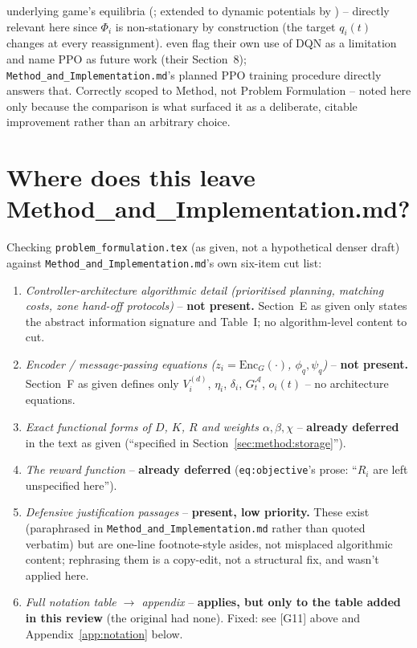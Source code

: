 \documentclass[11pt]{article}
\begin{document}
\begin{itemize}
    underlying game's equilibria (\citealp{ng1999policy}; extended to
    dynamic potentials by \citealp{devlin2012dynamic}) -- directly relevant
    here since $\Phi_i$ is non-stationary by construction (the target $q_i(t)$
    changes at every reassignment). \citeauthor{knippenberg2021} even flag
    their own use of DQN as a limitation and name PPO as future work (their
    Section~8); \texttt{Method\_and\_Implementation.md}'s planned PPO
    training procedure directly answers that. Correctly scoped to Method, not
    Problem Formulation -- noted here only because the comparison is what
    surfaced it as a deliberate, citable improvement rather than an
    arbitrary choice.
\end{itemize}

\section{Where does this leave Method\_and\_Implementation.md?}
\label{sec:method-mapping}

Checking \texttt{problem\_formulation.tex} (as given, not a hypothetical
denser draft) against \texttt{Method\_and\_Implementation.md}'s own
six-item cut list:

\begin{enumerate}
  \item \emph{Controller-architecture algorithmic detail (prioritised
    planning, matching costs, zone hand-off protocols)} -- \textbf{not
    present.} Section~E as given only states the abstract information
    signature and Table~I; no algorithm-level content to cut.
  \item \emph{Encoder / message-passing equations
    ($z_i=\mathrm{Enc}_G(\cdot)$, $\phi_q,\psi_q$)} -- \textbf{not present.}
    Section~F as given defines only $V_i^{(d)}$, $\eta_i$, $\delta_i$,
    $G_t^{\mathcal{A}}$, $o_i(t)$ -- no architecture equations.
  \item \emph{Exact functional forms of $D$, $K$, $R$ and weights
    $\alpha,\beta,\chi$} -- \textbf{already deferred} in the text as given
    (``specified in Section~\ref{sec:method:storage}'').
  \item \emph{The reward function} -- \textbf{already deferred}
    (\texttt{eq:objective}'s prose: ``$R_i$ are left unspecified here'').
  \item \emph{Defensive justification passages} -- \textbf{present, low
    priority.} These exist (paraphrased in
    \texttt{Method\_and\_Implementation.md} rather than quoted verbatim) but
    are one-line footnote-style asides, not misplaced algorithmic content;
    rephrasing them is a copy-edit, not a structural fix, and wasn't applied
    here.
  \item \emph{Full notation table $\to$ appendix} -- \textbf{applies, but
    only to the table added in this review} (the original had none). Fixed:
    see [G11] above and Appendix~\ref{app:notation} below.
\end{enumerate}
\end{document}
